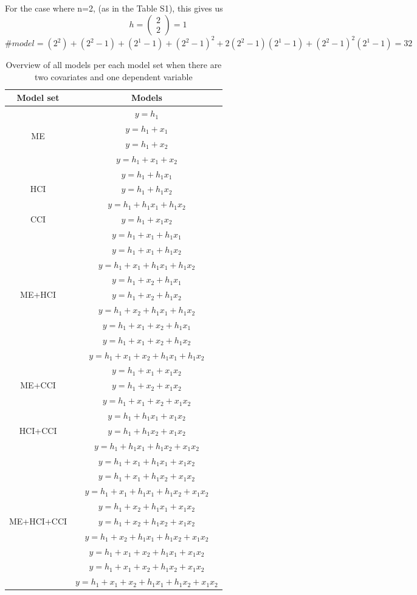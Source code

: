 For the case where n=2, (as in the Table S1), this gives us
\[h=\left( \begin{array}{c}
2 \\ 
2 \end{array}
\right)=1\] 
\[\#model=\left(2^2\right)+\left(2^2-1\right)+\left(2^1-1\right)+{\left(2^2-1\right)}^2+2\left(2^2-1\right)\left(2^1-1\right)+{\left(2^2-1\right)}^2\left(2^1-1\right)=32\] 

\begin{table}[hbt!]
\caption{}
\caption*{\footnotesize Overview of all models per each model set when there are two covariates and one dependent variable}
\centering
\begin{tabular}{cc}
\toprule
Model set & Models \\  
\midrule
\multirow{4}{*}{ME} & $y=h_1$ \\ & $y=h_1+x_1$ \\ & $y=h_1+x_2$ \\ & $y=h_1+x_1+x_2$ & \\ 
\multirow{3}{*}{HCI} & $y=h_1+h_1x_1$ \\ & $y=h_1+h_1x_2$ \\ & $y=h_1+h_1x_1+h_1x_2$ & \\
CCI & $y=h_1+x_1x_2$ & \\ 
\multirow{9}{*}{ME+HCI} & $y=h_1+x_1+h_1x_1$\\ & $y=h_1+x_1+h_1x_2$\\ & $y=h_1+x_1+h_1x_1+h_1x_2$\\ & $y=h_1+x_2+h_1x_1$\\ & $y=h_1+x_2+h_1x_2$\\ & $y=h_1+x_2+h_1x_1+h_1x_2$\\ & $y=h_1+x_1+x_2+h_1x_1$\\ & $y=h_1+x_1+x_2+h_1x_2$\\ & $y=h_1+x_1+x_2+h_1x_1+h_1x_2$ & \\ 
\multirow{3}{*}{ME+CCI} & $y=h_1+x_1+x_1x_2$\\ & $y=h_1+x_2+x_1x_2$\\ & $y=h_1+x_1+x_2+x_1x_2$ & \\
\multirow{3}{*}{HCI+CCI} & $y=h_1+h_1x_1+x_1x_2$\\ & $y=h_1+h_1x_2+x_1x_2$\\ & $y=h_1+h_1x_1+h_1x_2+x_1x_2$ & \\
\multirow{9}{*}{ME+HCI+CCI} & $y=h_1+x_1+h_1x_1+x_1x_2$\\ & $y=h_1+x_1+h_1x_2+x_1x_2$\\ & $y=h_1+x_1+h_1x_1+h_1x_2+x_1x_2$\\ & $y=h_1+x_2+h_1x_1+x_1x_2$\\ & $y=h_1+x_2+h_1x_2+x_1x_2$\\ & $y=h_1+x_2+h_1x_1+h_1x_2+x_1x_2$\\ & $y=h_1+x_1+x_2+h_1x_1+x_1x_2$\\ & $y=h_1+x_1+x_2+h_1x_2+x_1x_2$\\ & $y=h_1+x_1+x_2+h_1x_1+h_1x_2+x_1x_2$ \\ 
\bottomrule
\end{tabular}
\end{table}
\newpage
